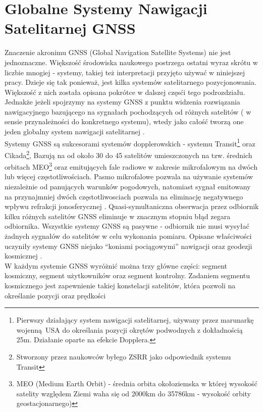 \section{Globalne Systemy Nawigacji Satelitarnej GNSS}
\noindent Znaczenie akronimu GNSS (Global Navigation Satellite Systems) nie jest jednoznaczne. Większość środowiska naukowego 
postrzega ostatni wyraz skrótu w liczbie mnogiej - systemy, takiej też interpretacji przyjęto używać w niniejszej pracy.
Dzieje się tak ponieważ, jest kilka systemów satelitarnego pozycjonowania. Większość z nich 
została opisana pokrótce w dalszej częsći tego podrozdziału. Jednakże jeżeli spojrzymy na systemy GNSS z punktu widzenia rozwiązania 
nawigacyjnego bazującego na sygnałach pochodzących od różnych satelitów ( w sensie przynależności do konkretnego systemu), wtedy jako całość 
tworzą one jeden globalny system nawigacji satelitarnej \cite[][strona vii]{hofmann_gnss}.\\
\indent Systemy GNSS są sukcesorami systemów dopplerowskich - systemu Transit\footnote{Pierwszy
działający system nawigacji satelitarnej, używany przez marunarkę wojenną USA 
do określania pozycji okrętów podwodnych z dokładnością 25m. Działanie oparte na efekcie Dopplera.} oraz Cikada\footnote{Stworzony przez naukowców byłego ZSRR 
jako odpowiednik systemu Transit}, Bazują na od około 30 do 45 satelitów umieszczonych na tzw. średnich orbitach MEO\footnote{MEO 
(Medium Earth Orbit) - średnia orbita okołoziemska w której wysokość satelity względem Ziemi waha się od 2000km do 35786km - wysokość orbity geostacjonarnego)}
oraz emitujących fale radiowe w zakresie mikrofalowym na dwóch lub więcej częstotliwościach.
Pasmo mikrofalowe pozwala na używanie systemów niezależnie od panujących warunków pogodowych, natomiast sygnał emitowany na przynajmniej dwóch częstotliwosciach 
pozwala na eliminację negatywnego wpływu refrakcji jonosferycznej \cite[][strona 33]{ggos}. Quasi-symultaniczna obserwacja przez odbiornik kilku różnych 
satelitów GNSS eliminuje w znacznym stopniu błąd zegara odbiornika. Wszystkie systemy GNSS są pasywne - odbiornik nie musi wysyłać żadnych sygnałów do satelitów w 
celu wykonania pomiaru. Opisane właściwości uczyniły systemy GNSS niejako \enquote{koniami pociągowymi} nawigacji oraz geodezji kosmicznej \cite[][strona 36]{ggos}.\\
\indent W każdym systemie GNSS wyróżnić można trzy główne części: segment kosmiczny, segment użytkowników oraz segment kontrolny.
Zadaniem segmentu kosmicznego jest zapewnienie takiej konstelacji satelitów, która pozwoli na określanie pozycji oraz prędkości
